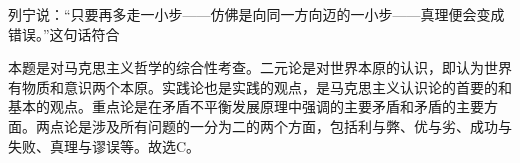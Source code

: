 \question 列宁说：``只要再多走一小步------仿佛是向同一方向迈的一小步------真理便会变成错误。''这句话符合
\par{}
\begin{solution}本题是对马克思主义哲学的综合性考查。二元论是对世界本原的认识，即认为世界有物质和意识两个本原。实践论也是实践的观点，是马克思主义认识论的首要的和基本的观点。重点论是在矛盾不平衡发展原理中强调的主要矛盾和矛盾的主要方面。两点论是涉及所有问题的一分为二的两个方面，包括利与弊、优与劣、成功与失败、真理与谬误等。故选C。
\end{solution}
